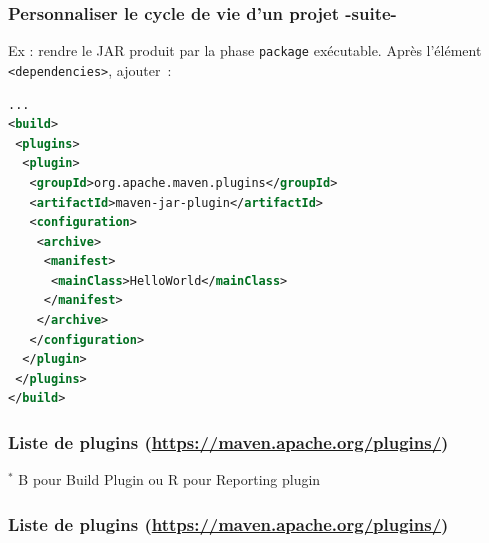 \documentclass{beamer}
\begin{document}
\begin{frame}[fragile]
	\frametitle{Personnaliser le cycle de vie d'un projet -suite-}
	Ex : rendre le JAR produit par la phase \texttt{package} exécutable. Après l'élément \texttt{<dependencies>}, ajouter~:
\begin{lstlisting}[language=XML,basicstyle=\scriptsize]		
...
<build>
 <plugins>
  <plugin>
   <groupId>org.apache.maven.plugins</groupId>
   <artifactId>maven-jar-plugin</artifactId>
   <configuration>
    <archive>
     <manifest>
      <mainClass>HelloWorld</mainClass>
     </manifest>
    </archive>
   </configuration>
  </plugin>
 </plugins>
</build>
\end{lstlisting}
\end{frame}

\begin{frame}[fragile]
  \frametitle{Liste de plugins {\normalsize (\url{https://maven.apache.org/plugins/})}}
  \begin{flushleft}
    \vspace{6cm}    
{\footnotesize    $^*$ B pour Build Plugin ou R pour Reporting plugin}
  \end{flushleft}
\end{frame}

\begin{frame}[fragile]
  \frametitle{Liste de plugins {\normalsize (\url{https://maven.apache.org/plugins/})}}
\end{frame}
\end{document}
